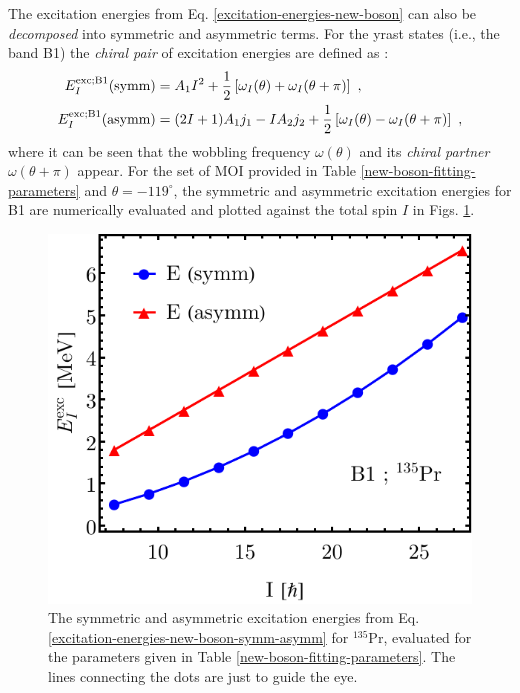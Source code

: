 The excitation energies from Eq. \ref{excitation-energies-new-boson} can also be \emph{decomposed} into symmetric and asymmetric terms. For the yrast states (i.e., the band B1) the \emph{chiral pair} of excitation energies are defined as \cite{raduta2020new}:
\begin{align}
    \centering
    E_I^\text{exc;B1}(\text{symm})&=A_1I^2+\frac{1}{2}\left[\omega_I(\theta)+\omega_I(\theta+\pi)\right]\ ,\nonumber\\
    E_I^\text{exc;B1}(\text{asymm})&=(2I+1)A_1j_1-IA_2j_2+\frac{1}{2}\left[\omega_I(\theta)-\omega_I(\theta+\pi)\right]\ ,
    \label{excitation-energies-new-boson-symm-asymm}
\end{align}
where it can be seen that the wobbling frequency $\omega(\theta)$ and its \emph{chiral partner} $\omega(\theta+\pi)$ appear. For the set of MOI provided in Table \ref{new-boson-fitting-parameters} and $\theta=-119^\circ$, the symmetric and asymmetric excitation energies for B1 are numerically evaluated and plotted against the total spin $I$ in Figs. \ref{chiral-excitation-energies-135Pr}.
\begin{figure}
    \centering
    \includegraphics[scale=0.8]{Chapters/Figures/chiral-excitation-energies-135Pr.pdf}
    \caption{The symmetric and asymmetric excitation energies from Eq. \ref{excitation-energies-new-boson-symm-asymm} for $^{135}$Pr, evaluated for the parameters given in Table \ref{new-boson-fitting-parameters}. The lines connecting the dots are just to guide the eye.}
    \label{chiral-excitation-energies-135Pr}
\end{figure}

